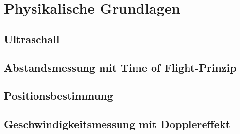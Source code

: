 
\chapter{Physikalische Grundlagen}

\section{Ultraschall}

\section{Abstandsmessung mit Time of Flight-Prinzip}

\section{Positionsbestimmung}


\section{Geschwindigkeitsmessung mit Dopplereffekt}




